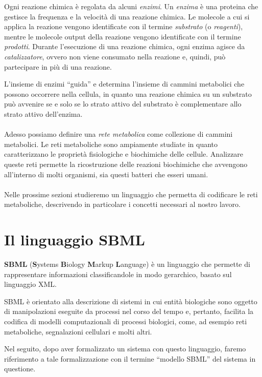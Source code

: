 Ogni reazione chimica \`e regolata da alcuni \emph{enzimi}. Un
\emph{enzima} \`e una proteina che gestisce la frequenza e la
velocit\`a di una reazione chimica. Le molecole a cui si applica la
reazione vengono identificate con il termine \emph{substrato} (o
\emph{reagenti}), mentre le molecole output della reazione vengono
identificate con il termine \emph{prodotti}.  Durante l'esecuzione di
una reazione chimica, ogni enzima agisce da \emph{catalizzatore},
ovvero non viene consumato nella reazione e, quindi, pu\`o partecipare
in pi\`u di una reazione.

L'insieme di enzimi ``guida'' e determina l'insieme di cammini
metabolici che possono occorrere nella cellula, in quanto una reazione
chimica su un substrato pu\`o avvenire se e solo se lo strato attivo
del substrato \`e complementare allo strato attivo dell'enzima.
\\\\
Adesso possiamo definire una \emph{rete metabolica} come collezione di
cammini metabolici. Le reti metaboliche sono ampiamente studiate in
quanto caratterizzano le propriet\`a fisiologiche e biochimiche delle
cellule. Analizzare queste reti permette la ricostruzione delle
reazioni biochimiche che avvengono all'interno di molti organismi, sia
questi batteri che esseri umani.
\\\\
Nelle prossime sezioni studieremo un linguaggio che permetta di
codificare le reti metaboliche, descrivendo in particolare i concetti
necessari al nostro lavoro.

\section{Il linguaggio SBML}
\textbf{SBML} (\textbf{S}ystems \textbf{B}iology \textbf{M}arkup
\textbf{L}anguage) \`e un linguaggio che permette di rappresentare
informazioni classificandole in modo gerarchico, basato sul linguaggio
XML.

SBML \`e orientato alla descrizione di sistemi in cui entit\`a
biologiche sono oggetto di manipolazioni eseguite da processi nel
corso del tempo e, pertanto, facilita la codifica di modelli
computazionali di processi biologici, come, ad esempio reti
metaboliche, segnalazioni cellulari e molti altri.

Nel seguito, dopo aver formalizzato un sistema con questo linguaggio,
faremo riferimento a tale formalizzazione con il termine ``modello
SBML'' del sistema in questione.

